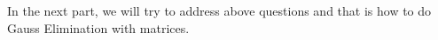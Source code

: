 \documentclass{article}
\begin{document}
                                    



In the next part, we will try to address above questions and that is how to do Gauss Elimination with matrices.
\end{document}
